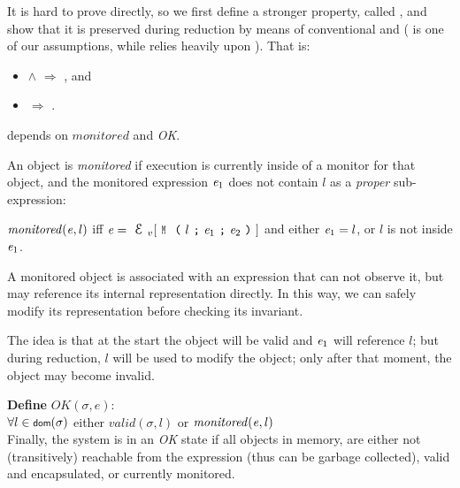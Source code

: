 It is hard to prove  directly,
so we first define a stronger property,
called , and
show that it is preserved during reduction by means of conventional
 and  ( is one of our assumptions,
while  relies heavily upon ).
That is:
\SSI\begin{itemize}
\item {} $\wedge$  $\Rightarrow$ , and
\item {} $\Rightarrow$ .
\end{itemize}


 depends on $\mathit{monitored}$ and \emph{OK}. 

An object is \emph{monitored} if execution
is currently inside of a monitor for that object, and
the monitored expression ${\mathit{e}}_1$ does not
contain $l$ as a \emph{proper} sub-expression:

\indent $\mathit{monitored}({\mathit{e}},l)$ iff
$\e=\ctx_v[\M{l}{\e_1}{\e_2}]$ and either ${\mathit{e}}_1=l$, or $l$ is not inside ${\mathit{e}}_1$.%

\noindent A monitored object is associated with an expression that can not observe it, but may
reference its internal representation directly.
In this way, we can safely modify its representation before checking its invariant.

The idea is that at the start the object will be valid and ${\mathit{e}}_1$ will reference $l$;
but during reduction, $l$ will be used to
modify the object; only after that moment, the object may become invalid.


\noindent\textbf{Define} $\mathit{OK}(\sigma,e)$:\\
\indent $\forall l\in\dom(\sigma)$
  either $\mathit{valid}(\sigma,l)$ or $\mathit{monitored}({\mathit{e}},l)$\\

\noindent Finally, the system is in an \emph{OK} state
if all objects in memory, are either
not (transitively) reachable from the expression (thus can be garbage collected),
valid and encapsulated,
or currently monitored.

